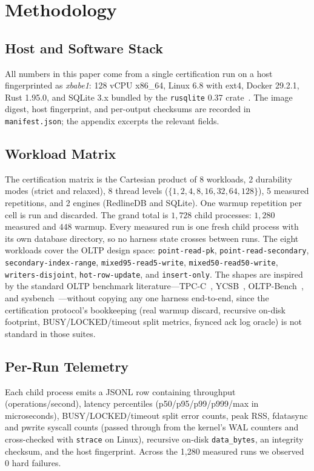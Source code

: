 \section{Methodology}\label{sec:method}

\subsection{Host and Software Stack}
All numbers in this paper come from a single certification run on a
host fingerprinted as \emph{xbabe1}: 128 vCPU x86\_64, Linux 6.8 with
ext4, Docker 29.2.1, Rust 1.95.0, and SQLite 3.x bundled by the
\texttt{rusqlite} 0.37 crate~\cite{rusqlite}. The image digest, host
fingerprint, and per-output checksums are recorded in
\texttt{manifest.json}; the appendix excerpts the relevant fields.

\subsection{Workload Matrix}
The certification matrix is the Cartesian product of 8 workloads, 2
durability modes (strict and relaxed), 8 thread levels
($\{1, 2, 4, 8, 16, 32, 64, 128\}$), 5 measured repetitions, and 2
engines (RedlineDB and SQLite). One warmup repetition per cell is run
and discarded. The grand total is $1{,}728$ child processes:
$1{,}280$ measured and $448$ warmup. Every measured run is one fresh
child process with its own database directory, so no harness state
crosses between runs. The eight workloads cover the OLTP design
space: \texttt{point-read-pk}, \texttt{point-read-secondary},
\texttt{secondary-index-range}, \texttt{mixed95-read5-write},
\texttt{mixed50-read50-write}, \texttt{writers-disjoint},
\texttt{hot-row-update}, and \texttt{insert-only}. The shapes are
inspired by the standard OLTP benchmark
literature---TPC-C~\cite{tpcc}, YCSB~\cite{cooper2010ycsb},
OLTP-Bench~\cite{difallah2013oltpbench}, and
sysbench~\cite{sysbench}---without copying any one harness
end-to-end, since the certification protocol's bookkeeping (real
warmup discard, recursive on-disk footprint, BUSY/LOCKED/timeout
split metrics, fsynced ack log oracle) is not standard in those
suites.

\subsection{Per-Run Telemetry}
Each child process emits a JSONL row containing throughput
(operations/second), latency percentiles
(p50/p95/p99/p999/max in microseconds), BUSY/LOCKED/timeout split
error counts, peak RSS, fdatasync and pwrite syscall counts (passed
through from the kernel's WAL counters and cross-checked with
\texttt{strace} on Linux), recursive on-disk \texttt{data\_bytes},
an integrity checksum, and the host fingerprint. Across the 1{,}280
measured runs we observed 0 hard failures.

